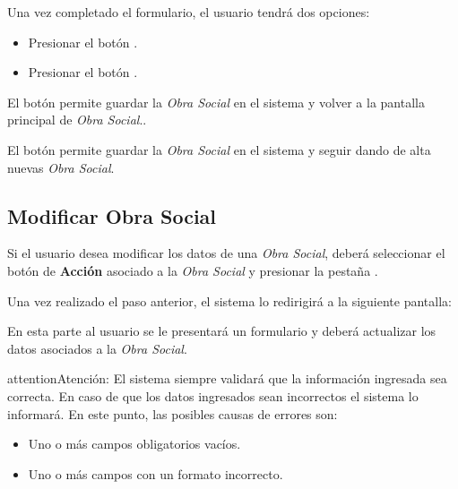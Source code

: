 \documentclass[a4paper,10pt,spanish]{sphinxmanual}
\begin{document}
Una vez completado el formulario, el usuario tendrá dos opciones:
\begin{itemize}
\item {} 
Presionar el botón .

\item {} 
Presionar el botón .

\end{itemize}

El botón  permite guardar la \emph{Obra Social} en el sistema y volver a la pantalla
principal de \emph{Obra Social}..

El botón  permite guardar la \emph{Obra Social} en el sistema y seguir dando de alta nuevas \emph{Obra Social}.


\subsection{Modificar Obra Social}
\label{obrassociales:modificar-obra-social}\label{obrassociales:modificar-obrasocial}
Si el usuario desea modificar los datos de una \emph{Obra Social}, deberá seleccionar el botón de \textbf{Acción} asociado a la \emph{Obra Social} y presionar la pestaña .


Una vez realizado el paso anterior, el sistema lo redirigirá a la siguiente pantalla:


En esta parte al usuario se le presentará un formulario y deberá actualizar los datos asociados a la \emph{Obra Social}.

\begin{notice}{attention}{Atención:}
El sistema siempre validará que la información ingresada sea correcta. En caso de que los datos ingresados sean incorrectos el sistema lo informará.
En este punto, las posibles causas de errores son:
\begin{itemize}
\item {} 
Uno o más campos obligatorios vacíos.

\item {} 
Uno o más campos con un formato incorrecto.

\end{itemize}
\end{notice}
\end{document}
